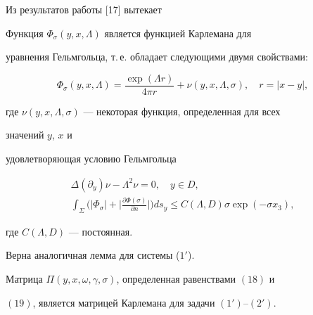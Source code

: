  


Из результатов работы [17] вытекает 


 


 


\begin{lem} 


Функция $\Phi_\sigma(y,x,\Lambda)$ является функцией Карлемана для 


уравнения Гельмгольца, т.\,е. обладает следующими двумя свойствами\/${:}$ 


$$ 


\Phi_\sigma(y,x,\Lambda)=\frac{\exp(\Lambda r)}{4\pi r} 


+\nu(y,x,\Lambda,\sigma),\quad r=|x-y|, 


$$ 


где $\nu(y,x,\Lambda,\sigma)$ --- некоторая функция, определенная для всех 


значений $y$, $x$ и 


удовлетворяющая условию Гельмгольца 


\begin{gather*} 


\Delta(\partial_y)\nu-\Lambda^2\nu=0,\quad y\in D,\\ 


% 


\int_\Sigma\bigg(|\Phi_\sigma|+\bigg| 


\frac{\partial\Phi(\sigma)}{\partial n}\bigg|\bigg)ds_y\le 


C(\Lambda,D)\sigma\exp(-\sigma x_3), 


\end{gather*} 


где $C(\Lambda,D)$ --- постоянная. 


\end{lem} 


 


 


Верна аналогичная лемма для системы ($1'$). 


 


 


\begin{lem} 


Матрица $\Pi(y,x,\omega,\gamma,\sigma)$, определенная равенствами $(18)$ и 


$(19)$, является матрицей Карлемана для задачи $(1')$--$(2')$. 


\end{lem} 


